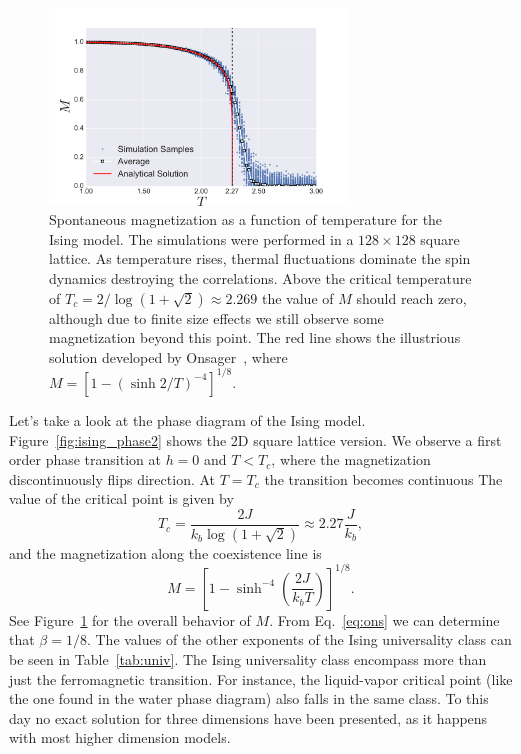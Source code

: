 \begin{figure}[t]
\begin{center}
    \includegraphics[width=0.7\textwidth]{chapters/ch2-crit/figs/ising_phase}
\end{center}
\caption{Spontaneous magnetization as a function of temperature for the Ising
    model. The simulations were performed in a $128\times128$ square lattice.
    As temperature rises, thermal fluctuations dominate the spin dynamics
    destroying the correlations. Above the critical temperature of
    $T_c=2/\log(1+\sqrt{2})\approx 2.269$ the value of $M$ should reach zero,
    although due to finite size effects we still observe some magnetization
    beyond this point. The red line shows the illustrious solution
    developed by Onsager~\cite{Onsager1944}, where
    $M={[1-{(\sinh{2/T})}^{-4}]}^{1/8}$.}
\label{fig:ising_phase}
\end{figure}

Let's take a look at the phase diagram of the Ising model.
Figure~\ref{fig:ising_phase2} shows the 2D square lattice version. We observe a
first order phase transition at $h=0$ and $T<T_c$, where the magnetization
discontinuously flips direction. At $T=T_c$ the transition becomes continuous
The value of the critical point is given by
\begin{equation}
    T_{c}=
    \frac{2J}{k_{b}\log\left(1+\sqrt{2}\right)}
    \approx2.27\frac{J}{k_{b}},
\end{equation}
and the magnetization along the coexistence line is~\cite{Yang1952}
\begin{equation}
    \label{eq:ons}
    M={\left[1-\sinh^{-4}\left(\frac{2J}{k_{b}T}\right)\right]}^{1/8}.
\end{equation}
See Figure~\ref{fig:ising_phase} for the overall behavior of $M$.
From Eq.~\ref{eq:ons} we can determine that $\beta=1/8$. The values of the
other exponents of the Ising universality class can be seen in
Table~\ref{tab:univ}. The Ising universality class encompass more than just the
ferromagnetic transition. For instance, the liquid-vapor critical point (like
the one found in the water phase diagram) also falls in the same class. To this
day no exact solution for three dimensions have been presented, as it happens
with most higher dimension models.

